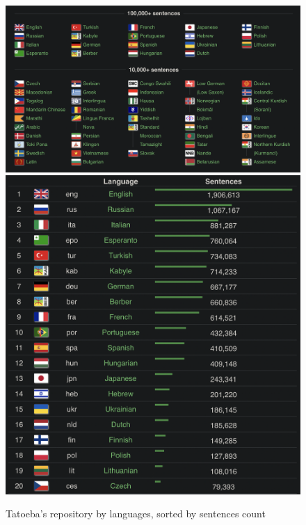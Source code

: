 \documentclass[a4paper, 11pt]{article}
\begin{document}
\begin{figure}[htbp]
    \centering
    \includegraphics[width=0.65\linewidth]{images/tatoeba_languages.png}
    \includegraphics[width=0.34\linewidth]{images/tatoeba_top_20_lang.png}
    \caption{Tatoeba's repository by languages, sorted by sentences count \cite{tatoeba}}
    \label{fig:tatoeba_languages}
\end{figure}
\end{document}
